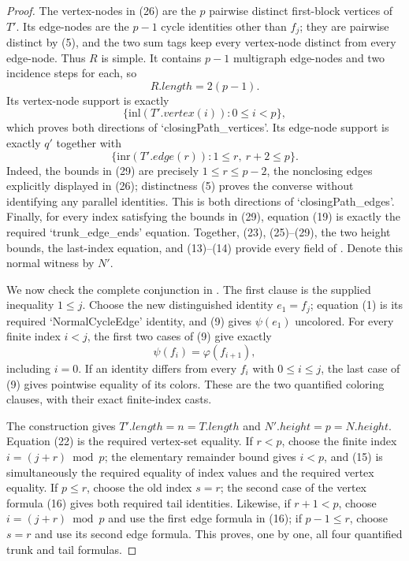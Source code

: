 \begin{proof}
The vertex-nodes in (26) are the $p$ pairwise distinct first-block
vertices of $T'$.  Its edge-nodes are the $p-1$ cycle identities other
than $f_j$; they are pairwise distinct by (5), and the two sum tags keep
every vertex-node distinct from every edge-node.  Thus $R$ is simple.
It contains $p-1$ multigraph edge-nodes and two incidence steps for each,
so
\[
                         R.length=2(p-1).                        \tag{27}
\]
Its vertex-node support is exactly
\[
 \{\mathrm{inl}(T'.vertex(i)):0\leq i<p\},                      \tag{28}
\]
which proves both directions of `closingPath_vertices'.  Its edge-node
support is exactly $q'$ together with
\[
 \{\mathrm{inr}(T'.edge(r)):1\leq r,\ r+2\leq p\}.             \tag{29}
\]
Indeed, the bounds in (29) are precisely $1\leq r\leq p-2$, the
nonclosing edges explicitly displayed in (26); distinctness (5) proves
the converse without identifying any parallel identities.  This is both
directions of `closingPath_edges'.  Finally, for every index satisfying
the bounds in (29), equation (19) is exactly the required
`trunk_edge_ends' equation.  Together, (23), (25)--(29), the two height
bounds, the last-index equation, and (13)--(14) provide every field of
.  Denote this normal witness by $N'$.

We now check the complete conjunction in .  The
first clause is the supplied inequality $1\leq j$.  Choose the new
distinguished identity $e_1=f_j$; equation (1) is its required
`NormalCycleEdge' identity, and (9) gives $\psi(e_1)$ uncolored.  For
every finite index $i<j$, the first two cases of (9) give exactly
\[
                   \psi(f_i)=\varphi(f_{i+1}),                   \tag{30}
\]
including $i=0$.  If an identity differs from every $f_i$ with
$0\leq i\leq j$, the last case of (9) gives pointwise equality of its
colors.  These are the two quantified coloring clauses, with their exact
finite-index casts.

The construction gives $T'.length=n=T.length$ and
$N'.height=p=N.height$.  Equation (22) is the required vertex-set
equality.  If $r<p$, choose the finite index
$i=(j+r)\bmod p$; the elementary remainder bound gives $i<p$, and (15)
is simultaneously the required equality of index values and the required
vertex equality.  If $p\leq r$, choose the old index $s=r$; the second
case of the vertex formula (16) gives both required tail identities.
Likewise, if $r+1<p$, choose $i=(j+r)\bmod p$ and use the first edge
formula in (16); if $p-1\leq r$, choose $s=r$ and use its second edge
formula.  This proves, one by one, all four quantified trunk and tail
formulas.


\end{proof}
